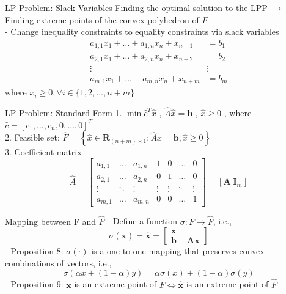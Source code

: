 \documentclass[aspectratio=169,hyperref,UTF8,CJK]{beamer}
\begin{document}
\begin{frame}{LP Problem: Slack Variables}
Finding the optimal solution to the LPP \(\longrightarrow\) Finding extreme points of the convex polyhedron of \(F\) \\
- Change inequality constraints to equality constraints via slack variables
\begin{align*}
a_{1,1}x_{1} + \ldots +a_{1,n}x_{n} + x_{n + 1} &= b_{1} \\
a_{2,1}x_{1} + \ldots +a_{2,n}x_{n} + x_{n + 2} &= b_{2} \\
\vdots & \vdots \\
a_{m,1}x_{1} + \ldots +a_{m,n}x_{n} + x_{n + m} &= b_{m}
\end{align*}
where \(x_{i} \geq 0, \forall i \in \{1, 2, \ldots , n + m\}\)
\end{frame}

\begin{frame}{LP Problem: Standard Form}
1. \(\min \hat{c}^{T}\hat{x}\) , \(\hat{A}\hat{x} = \mathbf{b}\) , \(\hat{x}\geq 0\) , where \(\hat{c} = [c_{1},\ldots ,c_{n},0,\ldots ,0]^{T}\) \\
2. Feasible set: \(\hat{F} = \left\{\hat{x}\in \mathbf{R}_{(n + m)\times 1}:\hat{A}\hat{x} = \mathbf{b},\hat{x}\geq 0\right\}\) \\
3. Coefficient matrix 
\[
\hat{A} = \begin{bmatrix} a_{1,1} & \ldots & a_{1,n} & 1 & 0 & \ldots & 0\\ a_{2,1} & \ldots & a_{2,n} & 0 & 1 & \ldots & 0\\ \vdots & \ddots & \vdots & \vdots & \vdots & \ddots & \vdots \\ a_{m,1} & \ldots & a_{m,n} & 0 & 0 & \ldots & 1 \end{bmatrix} = \left[ \mathbf{A}|\mathbf{I}_{m} \right]
\]
\end{frame}

\begin{frame}{Mapping between F and $\hat{F}$}
- Define a function \(\sigma : F \to \hat{F}\), i.e.,
\[
\sigma(\mathbf{x}) = \hat{\mathbf{x}} = \begin{bmatrix} \mathbf{x} \\ \mathbf{b} - \mathbf{A}\mathbf{x} \end{bmatrix}
\]
- Proposition 8: \(\sigma(\cdot)\) is a one-to-one mapping that preserves convex combinations of vectors, i.e.,
\[
\sigma(\alpha x + (1 - \alpha)y) = \alpha\sigma(x) + (1 - \alpha)\sigma(y)
\]
- Proposition 9: \(\mathbf{x}\) is an extreme point of \(F \iff \hat{\mathbf{x}}\) is an extreme point of \(\hat{F}\)
\end{frame}
\end{document}
